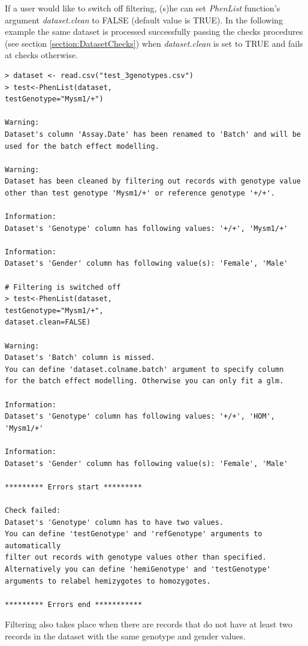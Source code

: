 \documentclass[12pt,a4paper]{article}
\begin{document}
If a user would like to switch off filtering, (s)he can set \textit{PhenList} function's argument \textit{dataset.clean} to FALSE (default value is TRUE). 
In the following example the same dataset is processed successfully passing the checks procedures (see section \ref{section:DatasetChecks}) when \textit{dataset.clean} is set to TRUE and fails at checks otherwise.

\begingroup
    \fontsize{8pt}{12pt}\selectfont
\begin{verbatim}
> dataset <- read.csv("test_3genotypes.csv")
> test<-PhenList(dataset,
testGenotype="Mysm1/+")

Warning:
Dataset's column 'Assay.Date' has been renamed to 'Batch' and will be used for the batch effect modelling.

Warning:
Dataset has been cleaned by filtering out records with genotype value 
other than test genotype 'Mysm1/+' or reference genotype '+/+'.

Information:
Dataset's 'Genotype' column has following values: '+/+', 'Mysm1/+'

Information:
Dataset's 'Gender' column has following value(s): 'Female', 'Male'

# Filtering is switched off
> test<-PhenList(dataset,
testGenotype="Mysm1/+",
dataset.clean=FALSE)

Warning:
Dataset's 'Batch' column is missed.
You can define 'dataset.colname.batch' argument to specify column 
for the batch effect modelling. Otherwise you can only fit a glm.

Information:
Dataset's 'Genotype' column has following values: '+/+', 'HOM', 'Mysm1/+'

Information:
Dataset's 'Gender' column has following value(s): 'Female', 'Male'

********* Errors start *********

Check failed:
Dataset's 'Genotype' column has to have two values.
You can define 'testGenotype' and 'refGenotype' arguments to automatically 
filter out records with genotype values other than specified. 
Alternatively you can define 'hemiGenotype' and 'testGenotype' arguments to relabel hemizygotes to homozygotes.

********* Errors end ***********
\end{verbatim}
\endgroup

Filtering also takes place when there are records that do not have at least two records in the dataset with the same genotype and gender values. 
\end{document}
